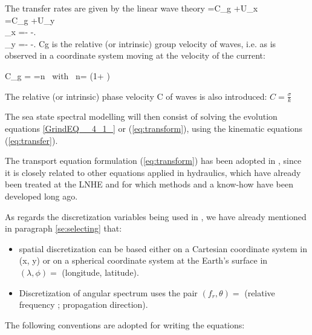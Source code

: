  The transfer rates are given by the linear wave theory \cite{Chaloin1989} \cite{Komen1994} \cite{Mei1983} \cite{Tolman1991}
\bequ
\label{eq:transfer}
\dsp
{}=C_{g}  +U_{x} \\[6pt]
\dsp
{}=C_{g}  +U_{y} \\[6pt]
\dsp
{}_{x} =-  -. \\[6pt]
\dsp
{}_{y} =-  -.
\earr 
\eequ
 Cg is the relative (or intrinsic) group velocity of waves, i.e. as is observed in a coordinate system moving at the velocity of the current:

\bequ
\label{eq:cg4_8}
C_{g} = =n \mbox{ with } n= \left(1+ \right)
\eequ

 The relative (or intrinsic) phase velocity C of waves is also introduced:  $C=\frac{\sigma }{k} $

 The sea state spectral modelling will then consist of solving the evolution equations \eqref{GrindEQ__4_1_} or (\ref{eq:transform}), using the kinematic equations (\ref{eq:transfer}).

 The transport equation formulation (\ref{eq:transform}) has been adopted in \tomawac, since it is closely related to other equations applied in hydraulics, which have already been treated at the LNHE and for which methods and a know-how have been developed long ago.

 As regards the discretization variables being used in \tomawac, we have already mentioned in paragraph \ref{se:selecting} that:

 \begin{itemize}
\item spatial discretization can be based either on a Cartesian coordinate system in (x, y) or on a spherical coordinate system at the Earth's surface in $(\lambda, \phi) =$ (longitude, latitude).
 \item Discretization of angular spectrum uses the pair $(f_r, \theta) =$ (relative frequency ; propagation direction).
\end{itemize}

 The following conventions are adopted for writing the equations:

